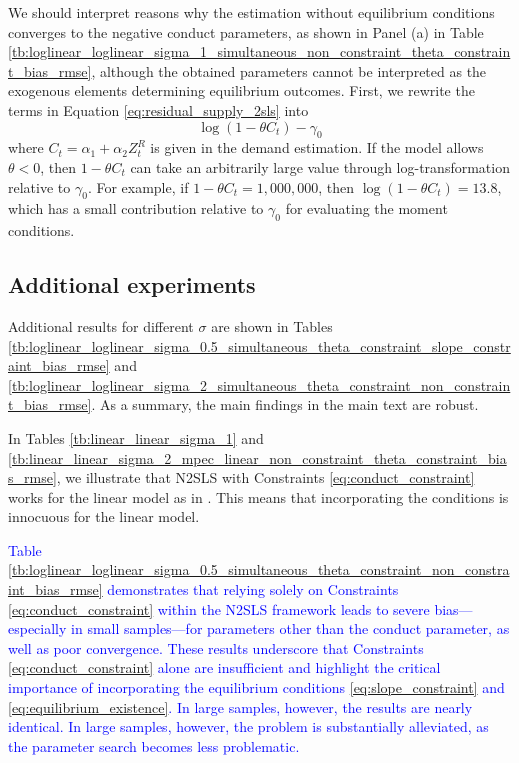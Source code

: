 \documentclass[11pt, a4paper]{article}
\theoremstyle{remark}
\begin{document}
We should interpret reasons why the estimation without equilibrium conditions converges to the negative conduct parameters, as shown in Panel (a) in Table \ref{tb:loglinear_loglinear_sigma_1_simultaneous_non_constraint_theta_constraint_bias_rmse}, although the obtained parameters cannot be interpreted as the exogenous elements determining equilibrium outcomes. 
First, we rewrite the terms in Equation \eqref{eq:residual_supply_2sls} into $$\log(1 - \theta C_{t})-\gamma_{0}$$
where $C_{t}=\alpha_1 + \alpha_2 Z^{R}_{t}$ is given in the demand estimation.
If the model allows $\theta<0$, then $1 - \theta C_{t}$ can take an arbitrarily large value through log-transformation relative to $\gamma_0$. 
For example, if $1 - \theta C_{t}=1,000,000$, then $\log(1 - \theta C_{t})=13.8$, which has a small contribution relative to $\gamma_0$ for evaluating the moment conditions.





\subsection{Additional experiments}\label{sec:additional_experiments}

Additional results for different $\sigma$ are shown in Tables \ref{tb:loglinear_loglinear_sigma_0.5_simultaneous_theta_constraint_slope_constraint_bias_rmse} and \ref{tb:loglinear_loglinear_sigma_2_simultaneous_theta_constraint_non_constraint_bias_rmse}. 
As a summary, the main findings in the main text are robust.

In Tables \ref{tb:linear_linear_sigma_1} and  \ref{tb:linear_linear_sigma_2_mpec_linear_non_constraint_theta_constraint_bias_rmse}, we illustrate that N2SLS with Constraints \eqref{eq:conduct_constraint} works for the linear model as in \cite{matsumura2023resolving}. 
This means that incorporating the conditions is innocuous for the linear model. 

\textcolor{blue}{Table \ref{tb:loglinear_loglinear_sigma_0.5_simultaneous_theta_constraint_non_constraint_bias_rmse} demonstrates that relying solely on Constraints \eqref{eq:conduct_constraint} within the N2SLS framework leads to severe bias—especially in small samples—for parameters other than the conduct parameter, as well as poor convergence. These results underscore that Constraints \eqref{eq:conduct_constraint} alone are insufficient and highlight the critical importance of incorporating the equilibrium conditions \eqref{eq:slope_constraint} and \eqref{eq:equilibrium_existence}. In large samples, however, the results are nearly identical. In large samples, however, the problem is substantially alleviated, as the parameter search becomes less problematic.}
\end{document}
